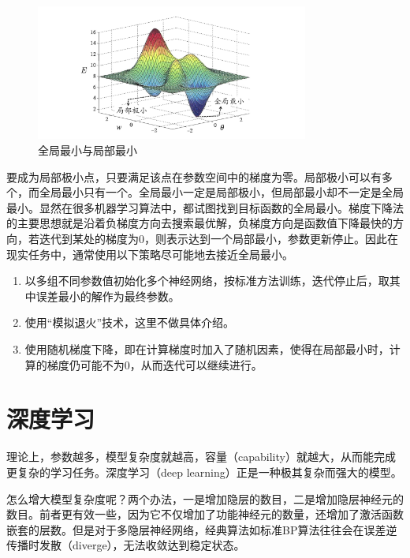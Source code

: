 \documentclass[12pt, a4paper]{article} %
\begin{document}
\begin{figure}[H]
    \centering
    \includegraphics[width=0.8\textwidth]{../img/5-8-全局最小与局部最小.png}
    \caption{全局最小与局部最小}
    \label{fig:全局最小与局部最小}
\end{figure}

要成为局部极小点，只要满足该点在参数空间中的梯度为零。局部极小可以有多个，而全局最小只有一个。全局最小一定是局部极小，但局部最小却不一定是全局最小。显然在很多机器学习算法中，都试图找到目标函数的全局最小。梯度下降法的主要思想就是沿着负梯度方向去搜索最优解，负梯度方向是函数值下降最快的方向，若迭代到某处的梯度为0，则表示达到一个局部最小，参数更新停止。因此在现实任务中，通常使用以下策略尽可能地去接近全局最小。

\begin{enumerate}[\hspace*{2em} i.]
    \item 以多组不同参数值初始化多个神经网络，按标准方法训练，迭代停止后，取其中误差最小的解作为最终参数。
    \item 使用“模拟退火”技术，这里不做具体介绍。
    \item 使用随机梯度下降，即在计算梯度时加入了随机因素，使得在局部最小时，计算的梯度仍可能不为0，从而迭代可以继续进行。
\end{enumerate}

\section{深度学习}

理论上，参数越多，模型复杂度就越高，容量（capability）就越大，从而能完成更复杂的学习任务。深度学习（deep learning）正是一种极其复杂而强大的模型。

怎么增大模型复杂度呢？两个办法，一是增加隐层的数目，二是增加隐层神经元的数目。前者更有效一些，因为它不仅增加了功能神经元的数量，还增加了激活函数嵌套的层数。但是对于多隐层神经网络，经典算法如标准BP算法往往会在误差逆传播时发散（diverge），无法收敛达到稳定状态。
\end{document}
